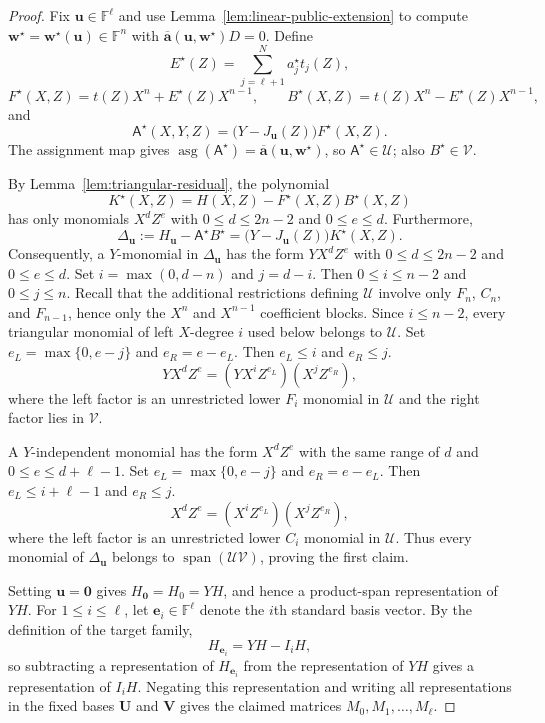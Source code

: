\documentclass[11pt]{article}
\theoremstyle{definition}
\newcommand{\F}{\mathbb F}
\newcommand{\cU}{\mathcal U}
\newcommand{\cV}{\mathcal V}
\newcommand{\Span}{\operatorname{span}}
\newcommand{\asg}{\operatorname{asg}}
\begin{document}
\begin{proof}
Fix $\mathbf u\in\F^\ell$ and use
Lemma~\ref{lem:linear-public-extension} to compute
$\mathbf w^\star=\mathbf w^\star(\mathbf u)\in\F^n$ with
$\overline{\mathbf a}(\mathbf u,\mathbf w^\star)D=0$.  Define
\[
  E^\star(Z)=\sum_{j=\ell+1}^{N}a_j^\star t_j(Z),
\]
\[
  F^\star(X,Z)=t(Z)X^n+E^\star(Z)X^{n-1},
  \qquad
  B^\star(X,Z)=t(Z)X^n-E^\star(Z)X^{n-1},
\]
and
\[
  \mathsf A^\star(X,Y,Z)
  =\bigl(Y-J_{\mathbf u}(Z)\bigr)F^\star(X,Z).
\]
The assignment map gives
$\asg(\mathsf A^\star)
 =\overline{\mathbf a}(\mathbf u,\mathbf w^\star)$, so
$\mathsf A^\star\in\cU$; also $B^\star\in\cV$.

By Lemma~\ref{lem:triangular-residual}, the polynomial
\[
  K^\star(X,Z)=H(X,Z)-F^\star(X,Z)B^\star(X,Z)
\]
has only monomials $X^dZ^e$ with $0\le d\le2n-2$ and $0\le e\le d$.
Furthermore,
\[
  \Delta_{\mathbf u}
  :=H_{\mathbf u}-\mathsf A^\star B^\star
  =\bigl(Y-J_{\mathbf u}(Z)\bigr)K^\star(X,Z).
\]
Consequently, a $Y$-monomial in $\Delta_{\mathbf u}$ has the form
$YX^dZ^e$ with $0\le d\le2n-2$ and $0\le e\le d$.
Set $i=\max(0,d-n)$ and $j=d-i$.  Then $0\le i\le n-2$ and
$0\le j\le n$.  Recall that the additional restrictions defining $\cU$
involve only $F_n$, $C_n$, and $F_{n-1}$, hence only the $X^n$ and
  $X^{n-1}$ coefficient blocks.  Since $i\le n-2$, every triangular monomial
  of left $X$-degree $i$ used below belongs to $\cU$.  Set
  $e_L=\max\{0,e-j\}$ and $e_R=e-e_L$.  Then $e_L\le i$ and $e_R\le j$.
\[
  YX^dZ^e=(YX^iZ^{e_L})(X^jZ^{e_R}),
\]
where the left factor is an unrestricted lower $F_i$ monomial in $\cU$ and
the right factor lies in $\cV$.

A $Y$-independent monomial has the form $X^dZ^e$ with the same range of $d$
and $0\le e\le d+\ell-1$.  Set $e_L=\max\{0,e-j\}$ and $e_R=e-e_L$.  Then
$e_L\le i+\ell-1$ and $e_R\le j$.
\[
  X^dZ^e=(X^iZ^{e_L})(X^jZ^{e_R}),
\]
where the left factor is an unrestricted lower $C_i$ monomial in $\cU$.
Thus every monomial of $\Delta_{\mathbf u}$ belongs to
$\Span(\cU\cV)$, proving the first claim.

Setting $\mathbf u=\mathbf 0$ gives $H_{\mathbf 0}=H_0=YH$, and hence a
product-span representation of $YH$.  For $1\le i\le\ell$, let
$\mathbf e_i\in\F^\ell$
denote the $i$th standard basis vector.  By the definition of the target
family,
\[
  H_{\mathbf e_i}=YH-I_iH,
\]
so subtracting a representation of $H_{\mathbf e_i}$ from the representation
of $YH$ gives a representation of $I_iH$.  Negating this representation and
writing all representations in the fixed bases $\mathbf U$ and $\mathbf V$
gives the claimed matrices $M_0,M_1,\ldots,M_\ell$.
\end{proof}
\end{document}
